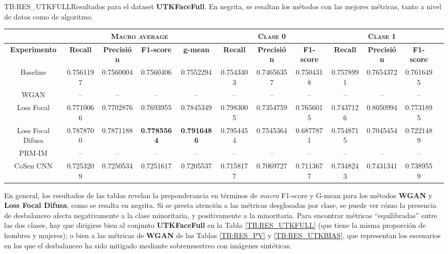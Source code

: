 \begin{landscape}
\begin{table}[Resultados UTKFaceFull]{TB:RES_UTKFULL}{Resultados para el dataset \textbf{UTKFaceFull}. En negrita, se resaltan los métodos con las mejores métricas, tanto a nivel de datos como de algoritmo.}
    \small
    \begin{tabular}{|c|c|c|c|c|c|c|c|c|c|c|c|}
    \hline
         &  \multicolumn{4}{c|}{\textsc{Macro average}} & \multicolumn{3}{c|}{\textsc{Clase 0}} & \multicolumn{3}{c|}{\textsc{Clase 1}}\\ \hline
        \textbf{Experimento} & \textbf{Recall} & \textbf{Precisión} & \textbf{F1-score} & \textbf{g-mean} & \textbf{Recall} & \textbf{Precisión} & \textbf{F1-score} & \textbf{Recall} & \textbf{Precisión} & \textbf{F1-score} \\ \hline
        Baseline & 0.7561197 & 0.7560004 & 0.7560406 & 0.7552294 & 0.7543403 & 0.74656357 & 0.7504318 & 0.7578991 & 0.7654372 & 0.7616495 \\ \hline
        WGAN & -- & -- & -- & -- & -- & -- & -- & -- & -- & -- \\ \hline
        Loss Focal & 0.7710066 & 0.7702876 & 0.7693955 & 0.7845349 & 0.7983005 & 0.7354759 & 0.7656015 & 0.7437126 & 0.8050994 & 0.7731895 \\ \hline
        Loss Focal Difusa & 0.7878700 & 0.7871188 & \textbf{0.7785564} & \textbf{0.7916486} & 0.7954454 & 0.7545364 & 0.6877871 & 0.7548715 & 0.7045454 & 0.7221489 \\ \hline
        PRM-IM & -- & -- & -- & -- & -- & -- & -- & -- & -- & -- \\ \hline
        CoSen CNN & 0.7253209 & 0.7250534 & 0.7251617 & 0.7205537 & 0.7158177 & 0.7069727 & 0.7113677 & 0.7348243 & 0.7431341 & 0.7389559 \\ \hline
    \end{tabular}
\end{table}
\end{landscape}

En general, los resultados de las tablas revelan la preponderancia en términos de \textit{macro} F1-score y G-mean para los métodos \textbf{WGAN} y \textbf{Loss Focal Difusa}, como se resalta en negrita. Si se presta atención a las métricas desglosadas por clase, se puede ver cómo la presencia de desbalanceo afecta negativamente a la clase minoritaria, y positivamente a la minoritaria. Para encontrar métricas ``equilibradas'' entre las dos clases, hay que dirigirse bien al conjunto \textbf{UTKFaceFull} en la Tabla \ref{TB:RES_UTKFULL} (que tiene la misma proporción de hombres y mujeres); o bien a las métricas de \textbf{WGAN} de las Tablas \ref{TB:RES_PV} y \ref{TB:RES_UTKBIAS}, que representan los escenarios en los que el desbalanceo ha sido mitigado mediante sobremuestreo con imágenes sintéticas.

